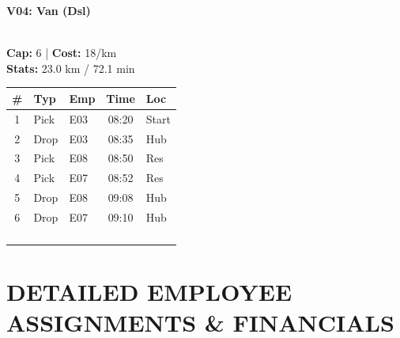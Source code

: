 \documentclass[a4paper,11pt]{article}
\begin{document}
\hfill
\begin{minipage}[t]{0.24\textwidth}
    \centering
    \colorbox{velorablue}{\parbox{\dimexpr\linewidth-2\fboxsep}{\centering \color{white}\textbf{V04: Van (Dsl)}}} \\
    \vspace{0.05cm}
    {\tiny \textbf{Cap:} 6 | \textbf{Cost:} 18/km \\ \textbf{Stats:} 23.0 km / 72.1 min}
    \vspace{0.05cm}
    
    \renewcommand{\arraystretch}{0.9}
    \setlength{\tabcolsep}{1pt}
    \tiny
    \begin{tabular}{c l l c l}
        \toprule
        \textbf{\#} & \textbf{Typ} & \textbf{Emp} & \textbf{Time} & \textbf{Loc} \\
        \midrule
        1 & Pick & E03 & 08:20 & Start \\
        \rowcolor{headergray} 2 & Drop & E03 & 08:35 & Hub \\
        3 & Pick & E08 & 08:50 & Res \\
        \rowcolor{headergray} 4 & Pick & E07 & 08:52 & Res \\
        5 & Drop & E08 & 09:08 & Hub \\
        \rowcolor{headergray} 6 & Drop & E07 & 09:10 & Hub \\
        & & & & \\
        & & & & \\
        & & & & \\
        & & & & \\
        \bottomrule
    \end{tabular}
\end{minipage}

\vspace{0.2cm}

\section*{\textcolor{velorablue}{\uppercase{Detailed Employee Assignments \& Financials}}}
\vspace{-0.3cm}
\end{document}
